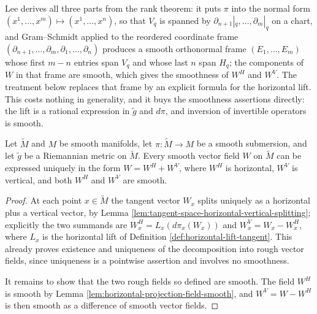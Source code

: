 Lee derives all three parts from the rank theorem: it puts $\pi$ into the normal
form $(x^1,\ldots,x^m) \mapsto (x^1,\ldots,x^n)$, so that $V_q$ is spanned by
$\partial_{n+1}|_q,\ldots,\partial_m|_q$ on a chart, and Gram--Schmidt applied to
the reordered coordinate frame $(\partial_{n+1},\ldots,\partial_m,\partial_1,\ldots,\partial_n)$
produces a smooth orthonormal frame $(E_1,\ldots,E_m)$ whose first $m-n$ entries
span $V_q$ and whose last $n$ span $H_q$; the components of $W$ in that frame are
smooth, which gives the smoothness of $W^H$ and $W^V$. The treatment below
replaces that frame by an explicit formula for the horizontal lift. This costs
nothing in generality, and it buys the smoothness assertions directly: the lift is
a rational expression in $\tilde{g}$ and $d\pi$, and inversion of invertible
operators is smooth.

\begin{proposition}
\label{prop:horizontal-vector-field-properties}
\leanok
{}

Let $\tilde{M}$ and $M$ be smooth manifolds, let $\pi : \tilde{M} \to M$ be a smooth submersion, and let $\tilde{g}$ be a Riemannian metric on $\tilde{M}$. Every smooth vector field $W$ on $\tilde{M}$ can be expressed uniquely in the form $W = W^H + W^V$, where $W^H$ is horizontal, $W^V$ is vertical, and both $W^H$ and $W^V$ are smooth.
\end{proposition}

\begin{proof}
\leanok
At each point $x \in \tilde{M}$ the tangent vector $W_x$ splits uniquely as a horizontal plus a vertical vector, by Lemma \ref{lem:tangent-space-horizontal-vertical-splitting}; explicitly the two summands are $W^H_x = L_x(d\pi_x(W_x))$ and $W^V_x = W_x - W^H_x$, where $L_x$ is the horizontal lift of Definition \ref{def:horizontal-lift-tangent}. This already proves existence and uniqueness of the decomposition into rough vector fields, since uniqueness is a pointwise assertion and involves no smoothness.

It remains to show that the two rough fields so defined are smooth. The field $W^H$ is smooth by Lemma \ref{lem:horizontal-projection-field-smooth}, and $W^V = W - W^H$ is then smooth as a difference of smooth vector fields.
\end{proof}

